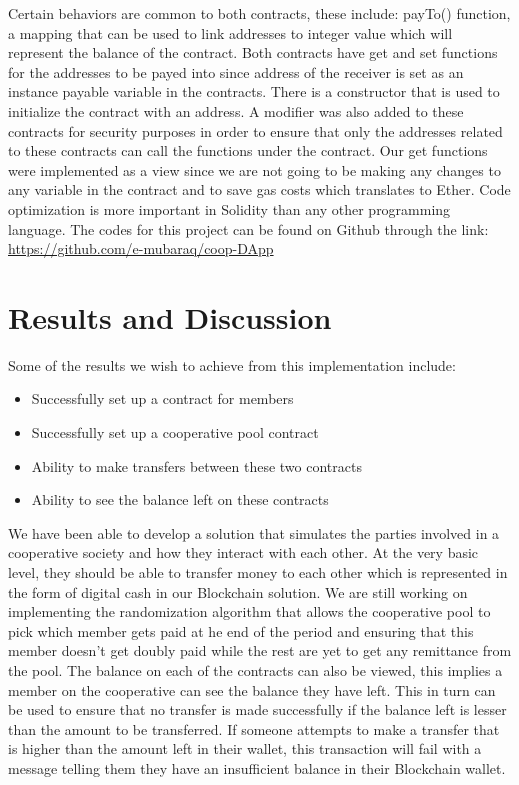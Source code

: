 \documentclass{article}
\begin{document}
\begin{flushleft}
Certain behaviors are common to both contracts, these  include: payTo() function, a mapping that can be used to link addresses to integer value which will represent the balance of the contract. Both contracts have get and set functions for the addresses to be payed into since address of the receiver is set as an instance payable variable in the contracts. There is a constructor that is used to initialize the contract with an address. A modifier was also added to these contracts for security purposes in order to ensure that only the addresses related to these contracts can call the functions under the contract. Our get functions were implemented as a view since we are not going to be making any changes to any variable in the contract and to save gas costs which translates to Ether. Code optimization is more important in Solidity than any other programming language. The codes for this project can be found on Github through the link: \url{https://github.com/e-mubaraq/coop-DApp}

\section{Results and Discussion}
Some of the results we wish to achieve from this implementation include:
\begin{itemize}
    \item Successfully set up a contract for members
    \item Successfully set up a cooperative pool contract
    \item Ability to make transfers between these two contracts
    \item Ability to see the balance left on these contracts
\end{itemize}
We have been able to develop a solution that simulates the parties involved in a cooperative society and how they interact with each other. At the very basic level, they should be able to transfer money to each other which is represented in the form of digital cash in our Blockchain solution. We are still working on implementing the randomization algorithm that allows the cooperative pool to pick which member gets paid at he end of the period and ensuring that this member doesn't get doubly paid while the rest are yet to get any remittance from the pool. The balance on each of the contracts can also be viewed, this implies a member on the cooperative can see the balance they have left. This in turn can be used to ensure that no transfer is made successfully if the balance left is lesser than the amount to be transferred. If someone attempts to make a transfer that is higher than the amount left in their wallet, this transaction will fail with a message telling them they have an insufficient balance in their Blockchain wallet.


\end{flushleft}
\end{document}
